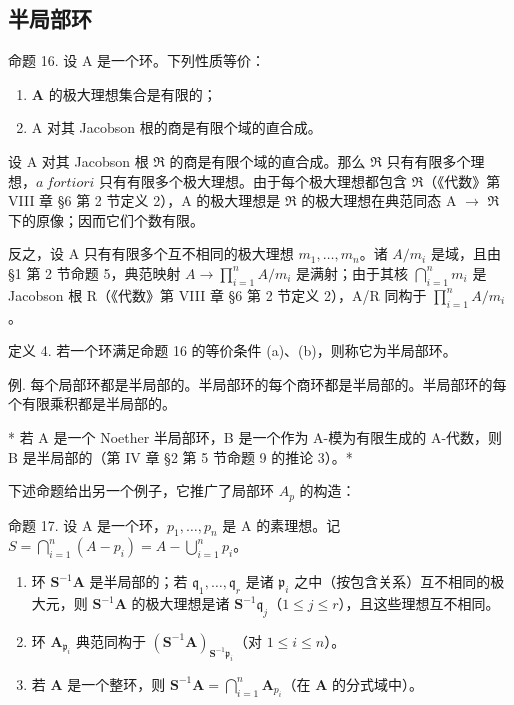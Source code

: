 \subsection{半局部环}

命题 16. 设 A 是一个环。下列性质等价：

\begin{enumerate}
\def\labelenumi{(\alph{enumi})}
\item
  \(\mathbf{A}\) 的极大理想集合是有限的；
\item
  A 对其 Jacobson 根的商是有限个域的直合成。
\end{enumerate}

设 A 对其 Jacobson 根 \(\Re\) 的商是有限个域的直合成。那么 \(\Re\) 只有有限多个理想，\(a\ fortiori\) 只有有限多个极大理想。由于每个极大理想都包含 \(\Re\)（《代数》第 VIII 章 §6 第 2 节定义 2），A 的极大理想是 \(\Re\) 的极大理想在典范同态 A \(\rightarrow\) \(\Re\) 下的原像；因而它们个数有限。

反之，设 A 只有有限多个互不相同的极大理想 \(m_{1}, \ldots, m_{n}\)。诸 \(A/m_{i}\) 是域，且由 §1 第 2 节命题 5，典范映射 \(A \to \prod_{i=1}^{n} A/m_{i}\) 是满射；由于其核 \(\bigcap_{i=1}^{n} m_{i}\) 是 Jacobson 根 R（《代数》第 VIII 章 §6 第 2 节定义 2），A/R 同构于 \(\prod_{i=1}^{n} A/m_{i}\)。

定义 4. 若一个环满足命题 16 的等价条件 (a)、(b)，则称它为半局部环。

例. 每个局部环都是半局部的。半局部环的每个商环都是半局部的。半局部环的每个有限乘积都是半局部的。

* 若 A 是一个 Noether 半局部环，B 是一个作为 A-模为有限生成的 A-代数，则 B 是半局部的（第 IV 章 §2 第 5 节命题 9 的推论 3）。*

下述命题给出另一个例子，它推广了局部环 \(A_{p}\) 的构造：

命题 17. 设 A 是一个环，\(p_1, \ldots, p_n\) 是 A 的素理想。记 \(S = \bigcap_{i=1}^{n} (A - p_i) = A - \bigcup_{i=1}^{n} p_i\)。

\begin{enumerate}
\def\labelenumi{(\alph{enumi})}
\item
  环 \(\mathbf{S}^{-1}\mathbf{A}\) 是半局部的；若 \(\mathfrak{q}_1, \ldots, \mathfrak{q}_r\) 是诸 \(\mathfrak{p}_i\) 之中（按包含关系）互不相同的极大元，则 \(\mathbf{S}^{-1}\mathbf{A}\) 的极大理想是诸 \(\mathbf{S}^{-1}\mathfrak{q}_j\)（\(1 \leqslant j \leqslant r\)），且这些理想互不相同。
\item
  环 \(\mathbf{A}_{\mathfrak{p}_i}\) 典范同构于 \((\mathbf{S}^{-1}\mathbf{A})_{\mathbf{S}^{-1}\mathfrak{p}_i}\)（对 \(1 \leqslant i \leqslant n\)）。
\item
  若 \(\mathbf{A}\) 是一个整环，则 \(\mathbf{S}^{-1}\mathbf{A} = \bigcap_{i=1}^{n}\mathbf{A}_{p_i}\)（在 \(\mathbf{A}\) 的分式域中）。
\end{enumerate}

